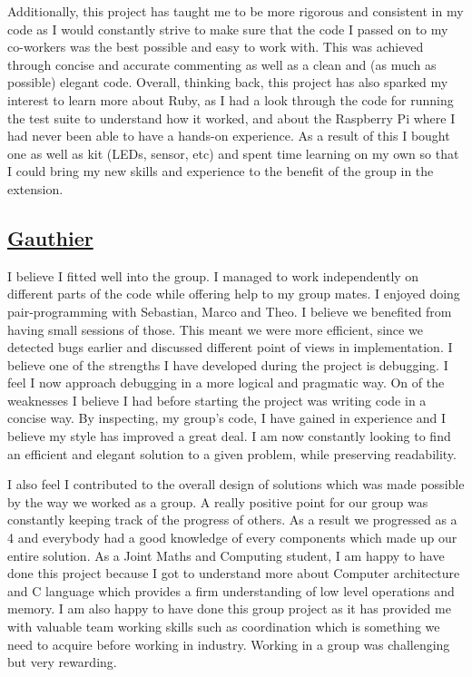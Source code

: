 \documentclass[10pt]{article}
\begin{document}
\hspace*{0.6cm}Additionally, this project has taught me to be more rigorous and consistent in my code as I would constantly strive to make sure that the code I passed on to my co-workers was the best possible and easy to work with. This was achieved through concise and accurate commenting as well as a clean and (as much as possible) elegant code. Overall, thinking back, this project has also sparked my interest to learn more about Ruby, as I had a look through the code for running the test suite to understand how it worked, and about the Raspberry Pi where I had never been able to have a hands-on experience. As a result of this I bought one as well as kit (LEDs, sensor, etc) and spent time learning on my own so that I could bring my new skills and experience to the benefit of the group in the extension.\newline

\subsection*{\underline{Gauthier}}
I believe I fitted well into the group. I managed to work independently on different parts of the code while offering help to my group mates. I enjoyed doing pair-programming with Sebastian, Marco and Theo. I believe we benefited from having small sessions of those. This meant we were more efficient, since we detected bugs earlier and discussed different point of views in implementation. I believe one of the strengths I have developed during the project is debugging. I feel I now approach debugging in a more logical and pragmatic way. On of the weaknesses I believe I had before starting the project was writing code in a concise way. By inspecting, my group's code, I have gained in experience and I believe my style has improved a great deal. I am now constantly looking to find an efficient and elegant solution to a given problem, while preserving readability.  

\hspace*{0.6cm}I also feel I contributed to the overall design of solutions which was made possible by the way we worked as a group. A really positive point for our group was constantly keeping track of the progress of others. As a result we progressed as a 4 and everybody had a good knowledge of every components which made up our entire solution. As a Joint Maths and Computing student, I am happy to have done this project because I got to understand more about Computer architecture and C language which provides a firm understanding of low level operations and memory. I am also happy to have done this group project as it has provided me with valuable team working skills such as coordination which is something we need to acquire before working in industry. Working in a group was challenging but very rewarding.
\end{document}
